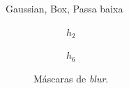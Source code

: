 
Gaussian, Box, Passa baixa

\begin{figure}[H]
    \centering
    \begin{subfigure}{0.4\textwidth}
        \centering
        
        \caption{~$h_2$}
        \label{fig:h2}
    \end{subfigure}%
    \begin{subfigure}{0.4\textwidth}
        \centering
        
        \caption{~$h_6$}
        \label{fig:h6}
    \end{subfigure}

    \caption{Máscaras de \textit{blur}.}
    \label{fig:blur:kernel}
\end{figure}

